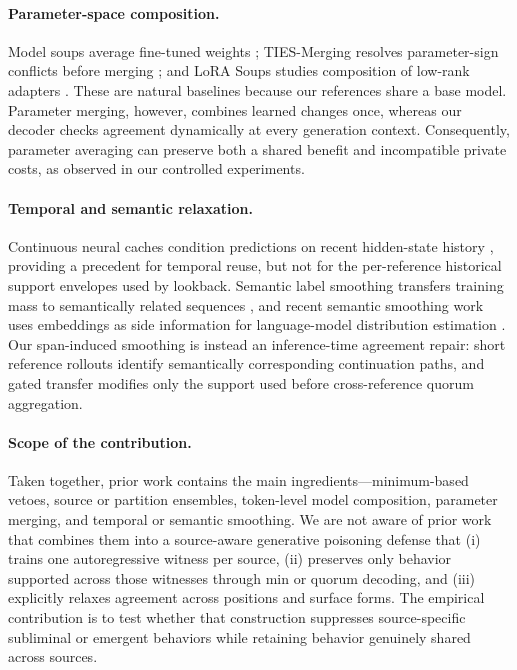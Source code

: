 \documentclass{article}
\begin{document}
\paragraph{Parameter-space composition.}
Model soups average fine-tuned weights \citep{wortsman2022soups};
TIES-Merging resolves parameter-sign conflicts before merging
\citep{yadav2023ties}; and LoRA Soups studies composition of low-rank adapters
\citep{prabhakar2024lorasoups}. These are natural baselines because our
references share a base model. Parameter merging, however, combines learned
changes once, whereas our decoder checks agreement dynamically at every
generation context. Consequently, parameter averaging can preserve both a
shared benefit and incompatible private costs, as observed in our controlled
experiments.

\paragraph{Temporal and semantic relaxation.}
Continuous neural caches condition predictions on recent hidden-state history
\citep{grave2016cache}, providing a precedent for temporal reuse, but not for
the per-reference historical support envelopes used by lookback. Semantic
label smoothing transfers training mass to semantically related sequences
\citep{lukasik2020semanticlabel}, and recent semantic smoothing work uses
embeddings as side information for language-model distribution estimation
\citep{balasundaram2026semanticsmoothing}. Our span-induced smoothing is
instead an inference-time agreement repair: short reference rollouts identify
semantically corresponding continuation paths, and gated transfer modifies
only the support used before cross-reference quorum aggregation.

\paragraph{Scope of the contribution.}
Taken together, prior work contains the main ingredients---minimum-based
vetoes, source or partition ensembles, token-level model composition,
parameter merging, and temporal or semantic smoothing. We are not aware of
prior work that combines them into a source-aware generative poisoning
defense that (i) trains one autoregressive witness per source, (ii) preserves
only behavior supported across those witnesses through min or quorum
decoding, and (iii) explicitly relaxes agreement across positions and surface
forms. The empirical contribution is to test whether that construction
suppresses source-specific subliminal or emergent behaviors while retaining
behavior genuinely shared across sources.



\end{document}
